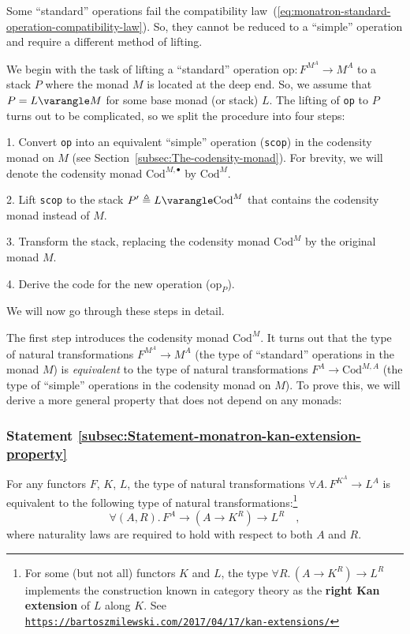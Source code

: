 Some \textsf{``}standard\textsf{''} operations fail the compatibility law~(\ref{eq:monatron-standard-operation-compatibility-law}).
So, they cannot be reduced to a \textsf{``}simple\textsf{''} operation and require
a different method of lifting.

We begin with the task of lifting a \textsf{``}standard\textsf{''} operation $\text{op}:F^{M^{A}}\rightarrow M^{A}$
to a stack $P$ where the monad $M$ is located at the deep end. So,
we assume that $P=L\varangle M$ for some base monad (or stack) $L$.
The lifting of \lstinline!op! to $P$ turns out to be complicated,
so we split the procedure into four steps:

1. Convert \lstinline!op! into an equivalent \textsf{``}simple\textsf{''} operation
(\lstinline!scop!) in the codensity 
monad on $M$ (see Section~\ref{subsec:The-codensity-monad}). For
brevity, we will denote the codensity monad $\text{Cod}^{M,\bullet}$
by $\text{Cod}^{M}$.

2. Lift \lstinline!scop! to the stack $P^{\prime}\triangleq L\varangle\text{Cod}^{M}$
that contains the codensity monad instead of $M$.

3. Transform the stack, replacing the codensity monad $\text{Cod}^{M}$
by the original monad $M$.

4. Derive the code for the new operation ($\text{op}_{P}$).

We will now go through these steps in detail. 

The first step introduces the codensity monad $\text{Cod}^{M}$. It
turns out that the type of natural transformations $F^{M^{A}}\rightarrow M^{A}$
(the type of \textsf{``}standard\textsf{''} operations in the monad $M$) is \emph{equivalent}
to the type of natural transformations $F^{A}\rightarrow\text{Cod}^{M,A}$
(the type of \textsf{``}simple\textsf{''} operations in the codensity monad on $M$).
To prove this, we will derive a more general property that does not
depend on any monads:

\subsubsection{Statement \label{subsec:Statement-monatron-kan-extension-property}\ref{subsec:Statement-monatron-kan-extension-property}}

For any functors $F$, $K$, $L$, the type of natural transformations
$\forall A.\,F^{K^{A}}\rightarrow L^{A}$ is equivalent to the following
type of natural transformations:\footnote{For some (but not all) functors $K$ and $L$, the type $\forall R.\,(A\rightarrow K^{R})\rightarrow L^{R}$
implements the construction known in category theory as the \textbf{right
Kan extension} of
$L$ along $K$. See \texttt{\href{https://bartoszmilewski.com/2017/04/17/kan-extensions/}{https://bartoszmilewski.com/2017/04/17/kan-extensions/}}}
\[
\forall(A,R).\,F^{A}\rightarrow(A\rightarrow K^{R})\rightarrow L^{R}\quad,
\]
where naturality laws are required to hold with respect to both $A$
and $R$.

